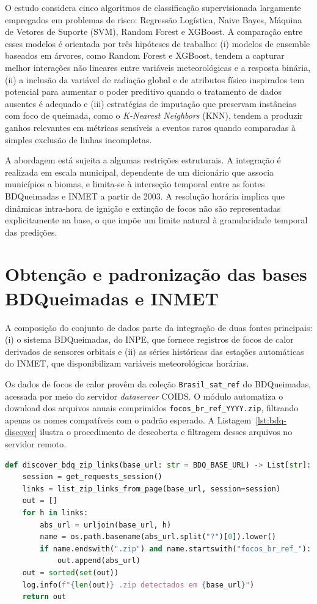 O estudo considera cinco algoritmos de classificação supervisionada largamente empregados em problemas de risco: Regressão Logística, Naive Bayes, Máquina de Vetores de Suporte (SVM), Random Forest e XGBoost. A comparação entre esses modelos é orientada por três hipóteses de trabalho: (i) modelos de ensemble baseados em árvores, como Random Forest e XGBoost, tendem a capturar melhor interações não lineares entre variáveis meteorológicas e a resposta binária, (ii) a inclusão da variável de radiação global e de atributos físico inspirados tem potencial para aumentar o poder preditivo quando o tratamento de dados ausentes é adequado e (iii) estratégias de imputação que preservam instâncias com foco de queimada, como o \textit{K-Nearest Neighbors} (KNN), tendem a produzir ganhos relevantes em métricas sensíveis a eventos raros quando comparadas à simples exclusão de linhas incompletas.

A abordagem está sujeita a algumas restrições estruturais. A integração é realizada em escala municipal, dependente de um dicionário que associa municípios a biomas, e limita-se à interseção temporal entre as fontes BDQueimadas e INMET a partir de 2003. A resolução horária implica que dinâmicas intra-hora de ignição e extinção de focos não são representadas explicitamente na base, o que impõe um limite natural à granularidade temporal das predições.

\section{Obtenção e padronização das bases BDQueimadas e INMET}
\label{sec:obtencao-dados}

A composição do conjunto de dados parte da integração de duas fontes principais: (i) o sistema BDQueimadas, do INPE, que fornece registros de focos de calor derivados de sensores orbitais e (ii) as séries históricas das estações automáticas do INMET, que disponibilizam variáveis meteorológicas horárias.

Os dados de focos de calor provêm da coleção \texttt{Brasil\_sat\_ref} do BDQueimadas, acessada por meio do servidor \textit{dataserver} COIDS. O módulo  automatiza o download dos arquivos anuais comprimidos \texttt{focos\_br\_ref\_YYYY.zip}, filtrando apenas os nomes compatíveis com o padrão esperado. A Listagem~\ref{lst:bdq-discover} ilustra o procedimento de descoberta e filtragem desses arquivos no servidor remoto.

\begin{lstlisting}[language=Python, caption={Descoberta e filtragem de arquivos anuais no BDQueimadas}, label={lst:bdq-discover}]
def discover_bdq_zip_links(base_url: str = BDQ_BASE_URL) -> List[str]:
    session = get_requests_session()
    links = list_zip_links_from_page(base_url, session=session)
    out = []
    for h in links:
        abs_url = urljoin(base_url, h)
        name = os.path.basename(abs_url.split("?")[0]).lower()
        if name.endswith(".zip") and name.startswith("focos_br_ref_"):
            out.append(abs_url)
    out = sorted(set(out))
    log.info(f"{len(out)} .zip detectados em {base_url}")
    return out
\end{lstlisting}

